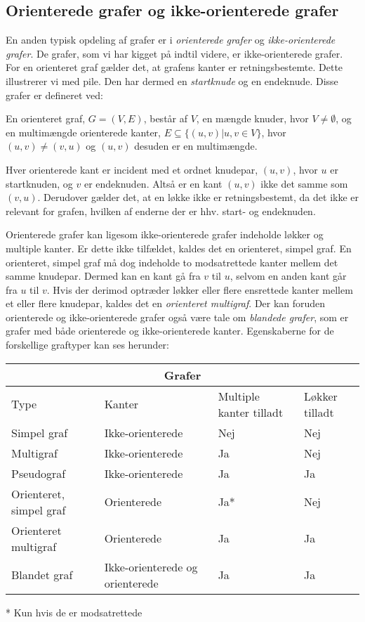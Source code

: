 \subsection{Orienterede grafer og ikke-orienterede grafer}
En anden typisk opdeling af grafer er i \emph{orienterede grafer} og \emph{ikke-orienterede grafer}. De grafer, som vi har kigget på indtil videre, er ikke-orienterede grafer. For en orienteret graf gælder det, at grafens kanter er retningsbestemte. Dette illustrerer vi med pile. Den har dermed en \emph{startknude} og en endeknude. Disse grafer er defineret ved:

\begin{defn}  
En orienteret graf, $G=(V,E)$, består af $V$, en mængde knuder, hvor $V \neq \emptyset$, og en multimængde orienterede kanter, $E \subseteq \{(u,v)|u,v \in V\}$, hvor $(u,v) \neq (v,u)$ og $(u,v)$ desuden er en multimængde. 
\end{defn}

Hver orienterede kant er incident med et ordnet knudepar, $(u,v)$, hvor $u$ er startknuden, og $v$ er endeknuden. Altså er en kant $(u,v)$ ikke det samme som $(v,u)$.
Derudover gælder det, at en løkke ikke er retningsbestemt, da det ikke er relevant for grafen, hvilken af enderne der er hhv. start- og endeknuden.



Orienterede grafer kan ligesom ikke-orienterede grafer indeholde løkker og multiple kanter. Er dette ikke tilfældet, kaldes det en orienteret, simpel graf. En orienteret, simpel graf må dog indeholde to modsatrettede kanter mellem det samme knudepar. Dermed kan en kant gå fra $v$ til $u$, selvom en anden kant går fra $u$ til $v$. Hvis der derimod optræder løkker eller flere ensrettede kanter mellem et eller flere knudepar, kaldes det en \emph{orienteret multigraf}. 
Der kan foruden orienterede og ikke-orienterede grafer også være tale om \emph{blandede grafer}, som er grafer med både orienterede og ikke-orienterede kanter.  
Egenskaberne for de forskellige graftyper kan ses herunder:


\begin{center} \label{tab:typer}
\begin{tabular}{ |p{4cm}|p{3cm}|p{3cm}|p{2cm}|  }
 \hline
 \multicolumn{4}{|c|}{Grafer} \\
 \hline
 Type & Kanter & Multiple kanter tilladt & Løkker tilladt\\
 \hline
 Simpel graf   & Ikke-orienterede    & Nej &   Nej\\
 Multigraf &   Ikke-orienterede & Ja   & Nej\\
 Pseudograf & Ikke-orienterede & Ja &  Ja\\
 Orienteret, simpel graf    & Orienterede & Ja* &  Nej\\
 Orienteret multigraf &  Orienterede  & Ja & Ja\\
 Blandet graf & Ikke-orienterede og orienterede  & Ja   & Ja\\
 \hline
\end{tabular}
\end{center}
* Kun hvis de er modsatrettede

